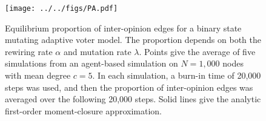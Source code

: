 \documentclass[english, 10pt]{scrartcl}
\begin{document}
\begin{figure}
	\centering
	\texttt{[image: ../../figs/PA.pdf]}
	\caption{Equilibrium proportion of inter-opinion edges for a binary state mutating adaptive voter model. The proportion depends on both the rewiring rate $\alpha$ and mutation rate $\lambda$. Points give the average of five simulations from an agent-based simulation on $N = 1,000$ nodes with mean degree $c = 5$. In each simulation, a burn-in time of 20,000 steps was used, and then the proportion of inter-opinion edges was averaged over the following 20,000 steps. Solid lines give the analytic first-order moment-closure approximation.}
\end{figure}


{}

\end{document}
